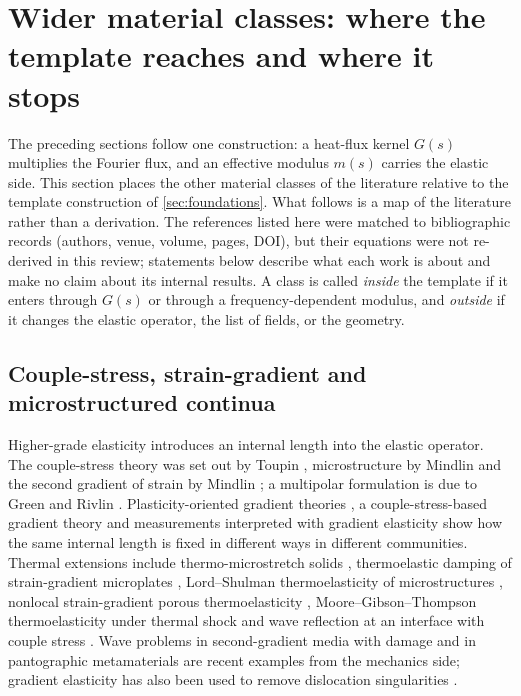 \section{Wider material classes: where the template reaches and where it stops}\label{sec:wider}
The preceding sections follow one construction: a heat-flux kernel $G(s)$ multiplies the Fourier flux, and an effective modulus $m(s)$ carries the elastic side. This section places the other material classes of the literature relative to the template construction of \cref{sec:foundations}. What follows is a map of the literature rather than a derivation. The references listed here were matched to bibliographic records (authors, venue, volume, pages, DOI), but their equations were not re-derived in this review; statements below describe what each work is about and make no claim about its internal results. A class is called \emph{inside} the template if it enters through $G(s)$ or through a frequency-dependent modulus, and \emph{outside} if it changes the elastic operator, the list of fields, or the geometry.

\subsection{Couple-stress, strain-gradient and microstructured continua}
Higher-grade elasticity introduces an internal length into the elastic operator. The couple-stress theory was set out by Toupin \cite{Toupin1962,Toupin1964}, microstructure by Mindlin \cite{Mindlin1964} and the second gradient of strain by Mindlin \cite{Mindlin1965}; a multipolar formulation is due to Green and Rivlin \cite{GreenRivlin1964}. Plasticity-oriented gradient theories \cite{FleckHutchinson1993}, a couple-stress-based gradient theory \cite{Yang2002} and measurements interpreted with gradient elasticity \cite{Lam2003} show how the same internal length is fixed in different ways in different communities. Thermal extensions include thermo-microstretch solids \cite{Eringen1990ThermoMicrostretch}, thermoelastic damping of strain-gradient microplates \cite{Borjalilou2020}, Lord--Shulman thermoelasticity of microstructures \cite{Alihemmati2022}, nonlocal strain-gradient porous thermoelasticity \cite{Zeng2025}, Moore--Gibson--Thompson thermoelasticity under thermal shock \cite{HosseiniLi2022} and wave reflection at an interface with couple stress \cite{Li2018CoupleStress}. Wave problems in second-gradient media with damage \cite{Mawassy2023} and in pantographic metamaterials \cite{GodaGanghoffer2026} are recent examples from the mechanics side; gradient elasticity has also been used to remove dislocation singularities \cite{GutkinAifantis1999,LazarMaugin2005}.

